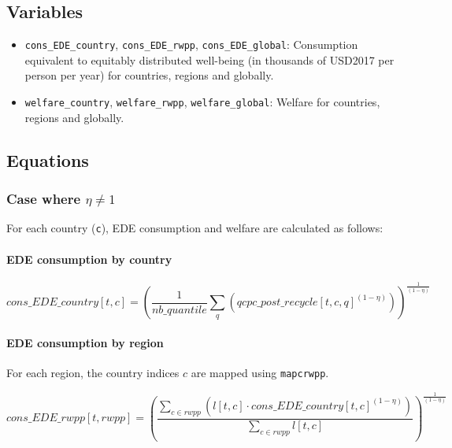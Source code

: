 \documentclass[
]{article}
\providecommand{\tightlist}{%
  \setlength{\itemsep}{0pt}\setlength{\parskip}{0pt}}
\begin{document}
\subsection{Variables}\label{variables-8}

\begin{itemize}
\tightlist
\item
  \texttt{cons\_EDE\_country}, \texttt{cons\_EDE\_rwpp},
  \texttt{cons\_EDE\_global}: Consumption equivalent to equitably
  distributed well-being (in thousands of USD2017 per person per year)
  for countries, regions and globally.
\item
  \texttt{welfare\_country}, \texttt{welfare\_rwpp},
  \texttt{welfare\_global}: Welfare for countries, regions and globally.
\end{itemize}

\subsection{Equations}\label{equations-5}

\subsubsection{\texorpdfstring{Case where
$\eta \neq 1$}{Case where \textbackslash eta \textbackslash neq 1}}\label{case-where-eta-neq-1}

For each country (\texttt{c}), EDE consumption and welfare are
calculated as follows:

\paragraph{EDE consumption by
country}\label{ede-consumption-by-country}

\begin{equation}
  cons\_EDE\_country[t,c] = \left( \frac{1}{nb\_quantile} \sum_q (qcpc\_post\_recycle[t,c,q]^{(1-\eta)} ) \right)^{\frac{1}{(1-\eta)}}
\end{equation}

\paragraph{EDE consumption by
region}\label{ede-consumption-by-region}

For each region, the country indices \(c\) are mapped using
\texttt{mapcrwpp}.

\begin{equation}
  cons\_EDE\_rwpp[t,rwpp] = \left( \frac{\sum_{c \in rwpp} (l[t,c] \cdot cons\_EDE\_country[t,c]^{(1-\eta)})}{\sum_{c \in rwpp} l[t,c]} \right)^{\frac{1}{(1-\eta)}}
\end{equation}
\end{document}
